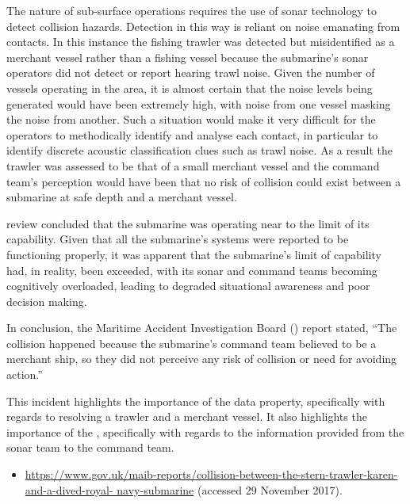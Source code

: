 The nature of sub-surface operations requires the use of sonar technology to detect collision hazards. Detection in this way is reliant on noise emanating from contacts. In this instance the fishing trawler was detected but misidentified as a merchant vessel rather than a fishing vessel because the submarine's sonar operators did not detect or report hearing trawl noise. Given the number of vessels operating in the area, it is almost certain that the noise levels being generated would have been extremely high, with noise from one vessel masking the noise from another. Such a situation would make it very difficult for the  operators to methodically identify and analyse each contact, in particular to identify discrete acoustic classification clues such as trawl noise. As a result the trawler was assessed to be that of a small merchant vessel and the command team's perception would have been that no risk of collision could exist between a submarine at safe depth and a merchant vessel. 

review concluded that the submarine was operating near to the limit of its capability. Given that all the submarine's systems were reported to be functioning properly, it was apparent that the submarine's limit of capability had, in reality, been exceeded, with its sonar and command teams becoming cognitively overloaded, leading to degraded situational awareness and poor decision making.

In conclusion, the Maritime Accident Investigation Board () report stated, ``The collision happened because the submarine's command team believed  to be a merchant ship, so they did not perceive any risk of collision or need for avoiding action.''

This incident highlights the importance of the  \gls{data property}, specifically with regards to resolving a trawler and a merchant vessel. It also highlights the importance of the , specifically with regards to the \gls{information} provided from the sonar team to the command team. 

\begin{samepage}
\begin{itemize}
  \item \raggedright{\href{https://www.gov.uk/maib-reports/collision-between-the-stern-trawler-karen-and-a-dived-royal-navy-submarine}{https://www.gov.uk/maib-reports/collision-between-the-stern-trawler-karen-and-a-dived-royal- navy-submarine} (accessed 29 November 2017).}
\end{itemize}
\end{samepage}


